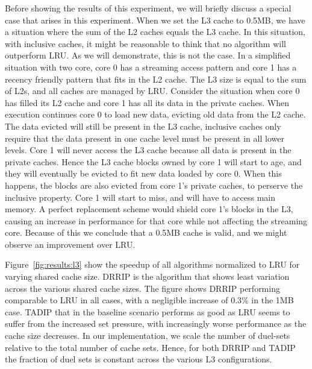Before showing the results of this experiment, we will briefly discuss a special case that arises in this experiment.
When we set the L3 cache to 0.5MB, we have a situation where the sum of the L2 caches equals the L3 cache.
In this situation, with inclusive caches, it might be reasonable to think that no algorithm will outperform LRU.
As we will demonstrate, this is not the case.
In a simplified situation with two core, core 0 has a streaming access pattern and core 1 has a recency friendly pattern that fits in the L2 cache.
The L3 size is equal to the sum of L2s, and all caches are managed by LRU.
Consider the situation when core 0 has filled its L2 cache and core 1 has all its data in the private caches.
When execution continues core 0 to load new data, evicting old data from the L2 cache.
The data evicted will still be present in the L3 cache, inclusive caches only require that the data present in one cache level must be present in all lower levels.
Core 1 will never access the L3 cache because all data is present in the private caches. 
Hence the L3 cache blocks owned by core 1 will start to age, and they will eventually be evicted to fit new data loaded by core 0.
When this happens, the blocks are also evicted from core 1's private caches, to perserve the inclusive property.
Core 1 will start to miss, and will have to access main memory.
A perfect replacement scheme would shield core 1's blocks in the L3, causing an increase in performance for that core while not affecting the streaming core.
Because of this we conclude that a 0.5MB cache is valid, and we might observe an improvement over LRU.

Figure~\ref{fig:results:l3} show the speedup of all algorithms normalized to LRU for varying shared cache size.
DRRIP is the algorithm that shows least variation across the various shared cache sizes.
The figure shows DRRIP performing comparable to LRU in all cases, with a negligible increase of 0.3\% in the 1MB case.
TADIP that in the baseline scenario performs as good as LRU seems to suffer from the increased set pressure, with increasingly worse performance as the cache size decreases.
In our implementation, we scale the number of duel-sets relative to the total number of cache sets.
Hence, for both DRRIP and TADIP the fraction of duel sets is constant across the various L3 configurations.

